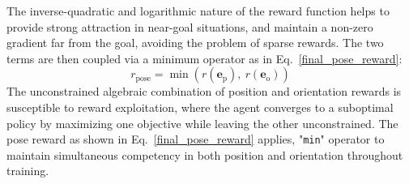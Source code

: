 \documentclass[preprint,12pt]{elsarticle}
\begin{document}
\noindent The inverse-quadratic and logarithmic nature of the reward function helps to provide strong attraction in near-goal situations, and maintain a non-zero gradient far from the goal, avoiding the problem of sparse rewards.
The two terms are then coupled via a minimum operator as in Eq.~\ref{final_pose_reward}:
\begin{equation}
    r_\text{pose} = \min(r({\mathbf{\text{e}}}_\text{p}),\ r({\mathbf{\text{e}}}_\text{o}))
    \label{final_pose_reward}
\end{equation}
The unconstrained algebraic combination of position and orientation rewards is susceptible to reward exploitation, where the agent converges to a suboptimal policy by maximizing one objective while leaving the other unconstrained. The pose reward as shown in Eq.~\ref{final_pose_reward} applies, "\texttt{min}" operator to maintain simultaneous competency in both position and orientation throughout training. 
\end{document}
